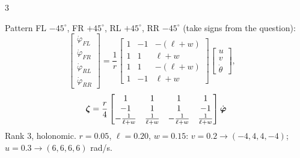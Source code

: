 \begin{multicols}{3}
\begin{fbx}[4 Swedish wheels \pg{55}, $\beta_i=0$, wheels at $(\pm\ell,\pm w)$ \added]
Pattern FL $-45^\circ$, FR $+45^\circ$, RL $+45^\circ$, RR $-45^\circ$ (take signs from the question):
\[\begin{bmatrix}\dot\varphi_{FL}\\\dot\varphi_{FR}\\\dot\varphi_{RL}\\\dot\varphi_{RR}\end{bmatrix}=\frac1r\begin{bmatrix}1&-1&-(\ell+w)\\1&1&\ell+w\\1&1&-(\ell+w)\\1&-1&\ell+w\end{bmatrix}\begin{bmatrix}u\\v\\\dot\theta\end{bmatrix},\quad
\]
\[\boldsymbol\zeta=\frac r4\begin{bmatrix}1&1&1&1\\-1&1&1&-1\\-\frac1{\ell+w}&\frac1{\ell+w}&-\frac1{\ell+w}&\frac1{\ell+w}\end{bmatrix}\dot{\boldsymbol\varphi}\]
Rank 3, holonomic. $r=0.05$, $\ell=0.20$, $w=0.15$: $v=0.2\to(-4,4,4,-4)$; $u=0.3\to(6,6,6,6)$ rad/s. \chk
\end{fbx}


\end{multicols}
